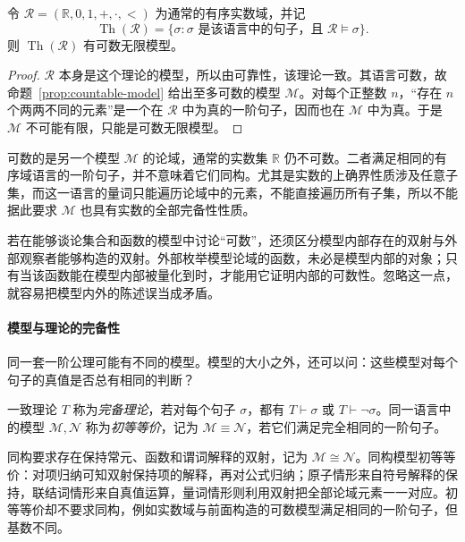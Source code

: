 \documentclass[lang=cn,a4paper,fontset=none,zihao=false,10pt,openany,twoside]{beautybook}
\numberwithin{algorithm}{chapter}
\newcommand{\R}{\mathbb R}
\begin{document}
\begin{proposition}[实数域的一阶理论有可数模型]
令 $\mathcal R=(\R,0,1,+,\cdot,<)$ 为通常的有序实数域，并记
\[
 \operatorname{Th}(\mathcal R)
 =\{\sigma:\sigma\text{ 是该语言中的句子，且 }\mathcal R\models\sigma\}.
\]
则 $\operatorname{Th}(\mathcal R)$ 有可数无限模型。
\end{proposition}
\begin{proof}
$\mathcal R$ 本身是这个理论的模型，所以由可靠性，该理论一致。其语言可数，故命题~\ref{prop:countable-model} 给出至多可数的模型 $\mathcal M$。对每个正整数 $n$，“存在 $n$ 个两两不同的元素”是一个在 $\mathcal R$ 中为真的一阶句子，因而也在 $\mathcal M$ 中为真。于是 $\mathcal M$ 不可能有限，只能是可数无限模型。
\end{proof}

\begin{remark}[模型内外的区别]
可数的是另一个模型 $\mathcal M$ 的论域，通常的实数集 $\R$ 仍不可数。二者满足相同的有序域语言的一阶句子，并不意味着它们同构。尤其是实数的上确界性质涉及任意子集，而这一语言的量词只能遍历论域中的元素，不能直接遍历所有子集，所以不能据此要求 $\mathcal M$ 也具有实数的全部完备性性质。

若在能够谈论集合和函数的模型中讨论“可数”，还须区分模型内部存在的双射与外部观察者能够构造的双射。外部枚举模型论域的函数，未必是模型内部的对象；只有当该函数能在模型内部被量化到时，才能用它证明内部的可数性。忽略这一点，就容易把模型内外的陈述误当成矛盾。
\end{remark}

\paragraph{模型与理论的完备性}
同一套一阶公理可能有不同的模型。模型的大小之外，还可以问：这些模型对每个句子的真值是否总有相同的判断？

\begin{definition}[完备理论与初等等价]
一致理论 $T$ 称为\emph{完备理论}，若对每个句子 $\sigma$，都有 $T\vdash\sigma$ 或 $T\vdash\neg\sigma$。同一语言中的模型 $\mathcal M,\mathcal N$ 称为\emph{初等等价}，记为 $\mathcal M\equiv\mathcal N$，若它们满足完全相同的一阶句子。
\end{definition}
同构要求存在保持常元、函数和谓词解释的双射，记为 $\mathcal M\cong\mathcal N$。同构模型初等等价：对项归纳可知双射保持项的解释，再对公式归纳；原子情形来自符号解释的保持，联结词情形来自真值运算，量词情形则利用双射把全部论域元素一一对应。初等等价却不要求同构，例如实数域与前面构造的可数模型满足相同的一阶句子，但基数不同。
\end{document}
